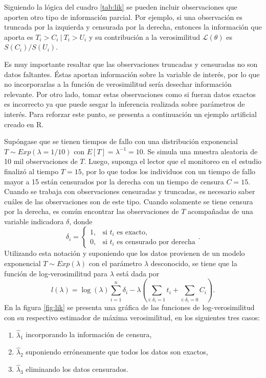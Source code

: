 \documentclass[11pt,a4paper]{article}
\begin{document}
Siguiendo la lógica del cuadro \ref{tab:lik} se pueden incluir observaciones que aporten otro tipo de información parcial. Por ejemplo, si una observación es truncada por la izquierda y censurada por la derecha, entonces la información que aporta es $T_i>C_i \ | \ T_i > U_i$ y su contribución a la verosimilitud $\mathcal{L}(\theta)$ es $S(C_i)/S(U_i)$.

Es muy importante resaltar que las observaciones truncadas y censuradas no son datos faltantes. Éstas aportan información sobre la variable de interés, por lo que no incorporarlas a la función de verosimilitud sería desechar información relevante. Por otro lado, tomar estas observaciones como si fueran datos exactos es incorrecto ya que puede sesgar la inferencia realizada sobre parámetros de interés. Para reforzar este punto, se presenta a continuación un ejemplo artificial creado en R.

\newpage

Supóngase que se tienen tiempos de fallo con una distribución exponencial $T \sim Exp(\lambda = 1/10)$ con $E[T] = \lambda^{-1} = 10$. Se simula una muestra aleatoria de 10 mil observaciones de $T$. Luego, suponga el lector que el monitoreo en el estudio finalizó al tiempo $T = 15$, por lo que todos los individuos con un tiempo de fallo mayor a 15 están censurados por la derecha con un tiempo de censura $C = 15$. Cuando se trabaja con observaciones censuradas y truncadas, es necesario saber cuáles de las observaciones son de este tipo. Cuando solamente se tiene censura por la derecha, es común encontrar las observaciones de $T$ acompañadas de una variable indicadora $\delta$, donde $$\delta_i = \begin{cases}
1, & \text{si } t_i \text{ es exacto},\\
0, & \text{si } t_i \text{ es censurado por derecha}
\end{cases}.$$ Utilizando esta notación y suponiendo que los datos provienen de un modelo exponencial $T\sim Exp(\lambda)$ con el parámetro $\lambda$ desconocido, se tiene que la función de log-verosimilitud para $\lambda$ está dada por $$l(\lambda) = \log (\lambda) \sum_{i = 1}^n \delta_i - \lambda \left(\sum_{i: \delta_i = 1} t_i + \sum_{i: \delta_i = 0} C_i\right).$$ En la figura \ref{fig:lik} se presenta una gráfica de las funciones de log-verosimilitud con su respectivo estimador de máxima verosimilitud, en los siguientes tres casos:
\begin{enumerate}
\item $\hat{\lambda}_1$ incorporando la información de censura,
\item $\hat{\lambda}_2$ suponiendo erróneamente que todos los datos son exactos,
\item $\hat{\lambda}_3$ eliminando los datos censurados.
\end{enumerate}
\end{document}

